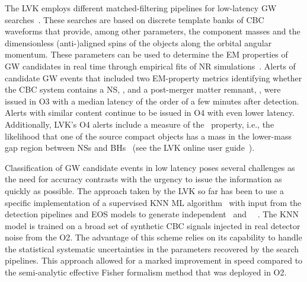 The \ac{LVK} employs different matched-filtering pipelines for low-latency \ac{GW}
searches~\cite{Sachdev:2019vvd,PhysRevD.95.042001,Sachdev:2020lfd,Nitz:2018rgo,Adams:2015ulm,Chu:2020pjv,Klimenko:2015ypf}. These searches are based on discrete template banks of \ac{CBC}
waveforms that provide, among other parameters, the component masses and the dimensionless (anti-)aligned spins of the objects along the orbital angular momentum. These parameters can be
used to determine the \ac{EM} properties of \ac{GW} candidates in real time through empirical fits of \ac{NR} simulations~\cite{Foucart:2012nc,Foucart:2018rjc}. Alerts of candidate
\ac{GW} events that included two \ac{EM}-property metrics identifying whether the \ac{CBC} system contains a \ac{NS}, \hasns, and a post-merger matter remnant, \hasrem, were issued in
\ac{O3} with a median latency of the order of a few minutes after detection. Alerts with similar content continue to be issued in \ac{O4} with even lower latency.  Additionally,
\ac{LVK}'s \ac{O4} alerts include a measure of the \hasgap\ property, i.e., the likelihood that one of the source compact objects has a mass in the lower-mass gap region between \acp{NS}
and \acp{BH}~\cite{Farah:2021qom} (see the \ac{LVK} online user guide~\cite{UserGuide}). 

Classification of \ac{GW} candidate events in low latency poses several challenges as the need for accuracy contrasts with the urgency to issue the information as quickly as possible. The
approach taken by the \ac{LVK} so far has been to use a specific implementation of a supervised \ac{KNN} \ac{ML}
algorithm~\cite{Pedregosa:2011ork} with input from the detection pipelines and \ac{EOS} models to generate independent \hasns\ and \hasrem\ ~\cite{Chatterjee:2019avs}. The \ac{KNN} model is trained on a broad set of synthetic \ac{CBC} signals injected in real detector noise from the \ac{O2}. The advantage of this
scheme relies on its capability to handle the statistical systematic uncertainties in the parameters recovered by the search pipelines. This approach allowed for a marked improvement in
speed compared to the semi-analytic effective Fisher formalism method that was deployed in \ac{O2}.


